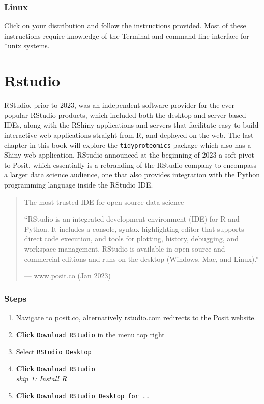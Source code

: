 \documentclass[
]{book}
\providecommand{\tightlist}{%
  \setlength{\itemsep}{0pt}\setlength{\parskip}{0pt}}
\begin{document}
\hypertarget{linux}{%
\subsubsection*{Linux}\label{linux}}

Click on your distribution and follow the instructions provided. Most of these instructions require knowledge of the Terminal and command line interface for *unix systems.

\hypertarget{rstudio}{%
\section{Rstudio}\label{rstudio}}

RStudio, prior to 2023, was an independent software provider for the ever-popular RStudio products, which included both the desktop and server based IDEs, along with the RShiny applications and servers that facilitate easy-to-build interactive web applications straight from R, and deployed on the web. The last chapter in this book will explore the \texttt{tidyproteomics} package which also has a Shiny web application. RStudio announced at the beginning of 2023 a soft pivot to Posit, which essentially is a rebranding of the RStudio company to encompass a larger data science audience, one that also provides integration with the Python programming language inside the RStudio IDE.

\begin{quote}
The most trusted IDE for open source data science

``RStudio is an integrated development environment (IDE) for R and Python. It includes a console, syntax-highlighting editor that supports direct code execution, and tools for plotting, history, debugging, and workspace management. RStudio is available in open source and commercial editions and runs on the desktop (Windows, Mac, and Linux).''

--- www.posit.co (Jan 2023)
\end{quote}

\hypertarget{steps-1}{%
\subsubsection*{Steps}\label{steps-1}}

\begin{enumerate}
\def\labelenumi{\arabic{enumi}.}
\tightlist
\item
  Navigate to \href{https://posit.co/}{posit.co}, alternatively \href{https://rstudio.com/}{rstudio.com} redirects to the Posit website.
\item
  \textbf{Click} \texttt{Download\ RStudio} in the menu top right
\item
  Select \texttt{RStudio\ Desktop}
\item
  \textbf{Click} \texttt{Download\ RStudio}\\
  \emph{skip 1: Install R}
\item
  \textbf{Click} \texttt{Download\ RStudio\ Desktop\ for\ ..}
\end{enumerate}
\end{document}
